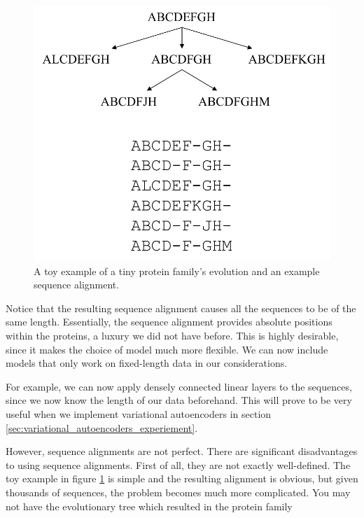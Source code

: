 \begin{figure}[ht]
    \centering
    \includegraphics{report/figures/sequence_alignments.pdf}
    \caption{A toy example of a tiny protein family's evolution and an example sequence alignment.}
    \label{fig:sequence_alignment_toy_example}
\end{figure}

Notice that the resulting sequence alignment causes all the sequences to be of the same length. Essentially, the sequence alignment provides absolute positions within the proteins, a luxury we did not have before. This is highly desirable, since it makes the choice of model much more flexible. We can now include models that only work on fixed-length data in our considerations.

For example, we can now apply densely connected linear layers to the sequences, since we now know the length of our data beforehand. This will prove to be very useful when we implement variational autoencoders in section \ref{sec:variational_autoencoders_experiement}.

However, sequence alignments are not perfect. There are significant disadvantages to using sequence alignments. First of all, they are not exactly well-defined. The toy example in figure \ref{fig:sequence_alignment_toy_example} is simple and the resulting alignment is obvious, but given thousands of sequences, the problem becomes much more complicated. You may not have the evolutionary tree which resulted in the protein family
